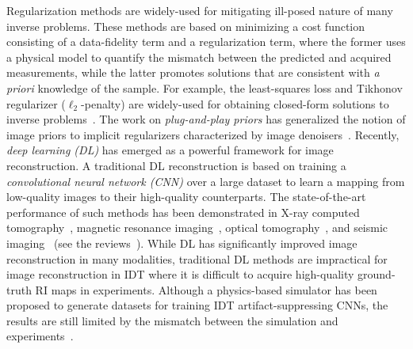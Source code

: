 \documentclass[11pt]{article}
\theoremstyle{plain} %
\begin{document}
Regularization methods are widely-used for mitigating ill-posed nature of many inverse problems. These methods are based on minimizing a cost function consisting of a data-fidelity term and a regularization term, where the former uses a physical model to quantify the mismatch between the predicted and acquired measurements, while the latter promotes solutions that are consistent with {\it a priori} knowledge of the sample.
For example, the least-squares loss and Tikhonov regularizer ($\ell_2$-penalty) are widely-used for obtaining closed-form solutions to inverse problems~\cite{Ling.etal18}. The work on \emph{plug-and-play priors} has generalized the notion of image priors to implicit regularizers characterized by image denoisers~\cite{Venkatakrishnan.etal2013,Sreehari.etal2016,Chan.etal2016,Ahmad.etal2020}. Recently, \emph{deep learning (DL)} has emerged as a powerful framework for image reconstruction. A traditional DL reconstruction is based on training a \emph{convolutional neural network (CNN)} over a large dataset to learn a mapping from low-quality images to their high-quality counterparts. The state-of-the-art performance of such methods has been demonstrated in X-ray computed tomography~\cite{Kang.etal2017,DJin.etal2017}, magnetic resonance imaging~\cite{Zhu.etal2018,Aggarwal.etal2019}, optical tomography~\cite{Sun.etal2018,Li.etal2018}, and seismic imaging~\cite{ZhangZ.etal2020} (see the reviews~\cite{Wang.etal2020,Liang.etal2020,Adler.eta2021}).
While DL has significantly improved image reconstruction in many modalities, traditional DL methods are impractical for image reconstruction in IDT where it is difficult to acquire high-quality ground-truth RI maps in experiments. Although a physics-based simulator has been proposed to generate datasets for training IDT artifact-suppressing CNNs, the results are still limited by the mismatch between the simulation and experiments~\cite{Alex.etal2021}.
\end{document}
